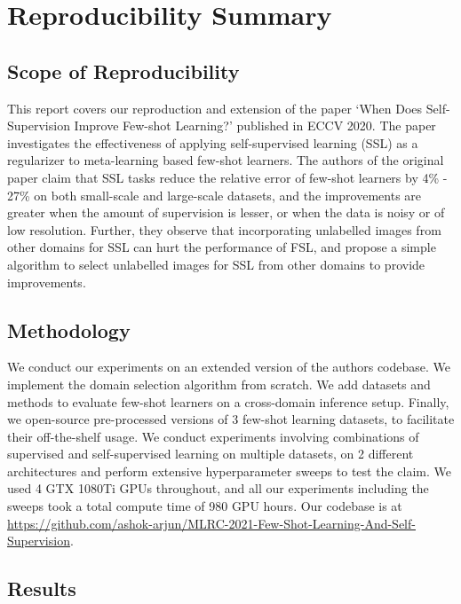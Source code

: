 \section{Reproducibility Summary}

\subsection*{Scope of Reproducibility}

This report covers our reproduction and extension of the paper `When Does Self-Supervision Improve Few-shot Learning?' published in ECCV 2020. The paper investigates the effectiveness of applying self-supervised learning (SSL) as a regularizer to meta-learning based few-shot learners. The authors of the original paper claim that SSL tasks reduce the relative error of few-shot learners by 4\% - 27\% on both small-scale and large-scale datasets, and the improvements are greater when the amount of supervision is lesser, or when the data is noisy or of low resolution. Further, they observe that incorporating unlabelled images from other domains for SSL can hurt the performance of FSL, and propose a simple algorithm to select unlabelled images for SSL from other domains to provide improvements. 

\subsection*{Methodology}

We conduct our experiments on an extended version of the authors codebase. We implement the domain selection algorithm from scratch. We add datasets and methods to evaluate few-shot learners on a cross-domain inference setup. Finally, we open-source pre-processed versions of $3$ few-shot learning datasets, to facilitate their off-the-shelf usage. We conduct experiments involving combinations of supervised and self-supervised learning on multiple datasets, on 2 different architectures and perform extensive hyperparameter sweeps to test the claim. We used 4 GTX 1080Ti GPUs throughout, and all our experiments including the sweeps took a total compute time of 980 GPU hours. Our codebase is at \href{https://github.com/ashok-arjun/MLRC-2021-Few-Shot-Learning-And-Self-Supervision}{https://github.com/ashok-arjun/MLRC-2021-Few-Shot-Learning-And-Self-Supervision}.
\subsection*{Results}

